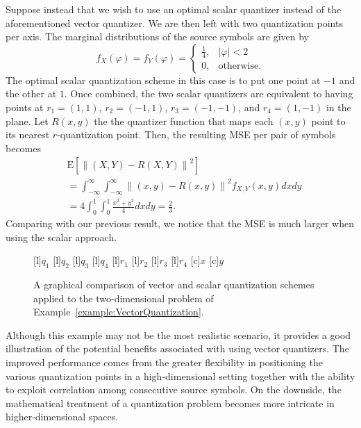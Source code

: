 \begin{example}
Suppose instead that we wish to use an optimal scalar quantizer instead of the aforementioned vector quantizer.
We are then left with two quantization points per axis.
The marginal distributions of the source symbols are given by
\begin{equation*}
f_X (\varphi) = f_Y (\varphi)
= \begin{cases} \frac{1}{4}, & |\varphi| < 2 \\
0, & \text{otherwise} . \end{cases}
\end{equation*}
The optimal scalar quantization scheme in this case is to put one point at $-1$ and the other at $1$.
Once combined, the two scalar quantizers are equivalent to having points at $r_1 = (1,1)$, $r_2 = (-1,1)$, $r_3 = (-1,-1)$, and $r_4 = (1,-1)$ in the plane.
Let $R(x,y)$ the the quantizer function that maps each $(x,y)$ point to its nearest $r$-quantization point.
Then, the resulting MSE per pair of symbols becomes
\begin{equation*}
\begin{split}
&\mathrm{E} \left[ \left\| (X,Y) - R(X,Y) \right\|^2 \right] \\
&= \int_{-\infty}^{\infty} \int_{-\infty}^{\infty}
\left\| (x, y) - R(x, y) \right\|^2 f_{X,Y}(x,y) dx dy \\
&= 4 \int_0^1 \int_0^1 \frac{x^2 + y^2}{4} dx dy
= \frac{2}{3} .
\end{split}
\end{equation*}
Comparing with our previous result, we notice that the MSE is much larger when using the scalar approach.
\begin{figure}[htbp]
\begin{center}
\begin{psfrags}
[l]{$q_1$}
[l]{$q_2$}
[l]{$q_3$}
[l]{$q_4$}
[l]{$r_1$}
[l]{$r_2$}
[l]{$r_3$}
[l]{$r_4$}
[c]{$x$}
[c]{$y$}
\end{psfrags}
\caption{A graphical comparison of vector and scalar quantization schemes applied to the two-dimensional problem of Example~\ref{example:VectorQuantization}.}
\label{figure:VectorQuantizer}
\end{center}
\end{figure}
\end{example}

Although this example may not be the most realistic scenario, it provides a good illustration of the potential benefits associated with using vector quantizers.
The improved performance comes from the greater flexibility in positioning the various quantization points in a high-dimensional setting together with the ability to exploit correlation among consecutive source symbols.
On the downside, the mathematical treatment of a quantization problem becomes more intricate in higher-dimensional spaces.


